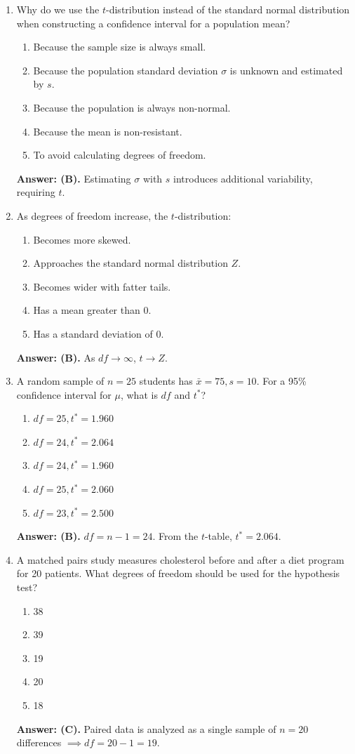 \begin{enumerate}[leftmargin=1.5em]
  \item Why do we use the $t$-distribution instead of the standard normal distribution when constructing a confidence interval for a population mean?
  \begin{enumerate}[label=(\Alph*)]
    \item Because the sample size is always small.
    \item Because the population standard deviation $\sigma$ is unknown and estimated by $s$.
    \item Because the population is always non-normal.
    \item Because the mean is non-resistant.
    \item To avoid calculating degrees of freedom.
  \end{enumerate}
  \textbf{Answer: (B).} Estimating $\sigma$ with $s$ introduces additional variability, requiring $t$.

  \item As degrees of freedom increase, the $t$-distribution:
  \begin{enumerate}[label=(\Alph*)]
    \item Becomes more skewed. \item Approaches the standard normal distribution $Z$. \item Becomes wider with fatter tails. \item Has a mean greater than 0. \item Has a standard deviation of 0.
  \end{enumerate}
  \textbf{Answer: (B).} As $df \to \infty$, $t \to Z$.

  \item A random sample of $n = 25$ students has $\bar{x} = 75, s = 10$. For a 95\% confidence interval for $\mu$, what is $df$ and $t^*$?
  \begin{enumerate}[label=(\Alph*)]
    \item $df = 25, t^* = 1.960$ \item $df = 24, t^* = 2.064$ \item $df = 24, t^* = 1.960$ \item $df = 25, t^* = 2.060$ \item $df = 23, t^* = 2.500$
  \end{enumerate}
  \textbf{Answer: (B).} $df = n - 1 = 24$. From the $t$-table, $t^* = 2.064$.

  \item A matched pairs study measures cholesterol before and after a diet program for 20 patients. What degrees of freedom should be used for the hypothesis test?
  \begin{enumerate}[label=(\Alph*)]
    \item 38 \item 39 \item 19 \item 20 \item 18
  \end{enumerate}
  \textbf{Answer: (C).} Paired data is analyzed as a single sample of $n = 20$ differences $\implies df = 20 - 1 = 19$.


\end{enumerate}

